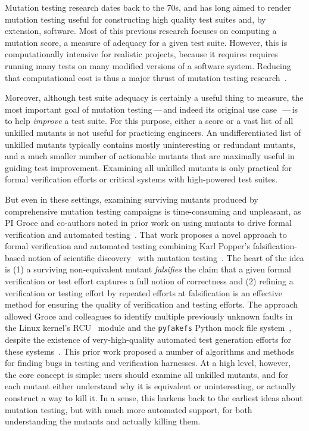 Mutation testing research dates back to the 70s, and has long aimed to render
mutation testing useful for constructing high quality
test suites and, by extension, software.
Most of this previous
research focuses on computing a mutation score, a measure of adequacy for a
given test suite.  However, this is computationally intensive for realistic
projects, because it requires requires running many tests on many modified
versions of a software system.  Reducing that computational cost is thus a major
thrust of mutation testing research~\cite{jia2011analysis}.

Moreover, although test suite adequacy is certainly a useful thing to measure, the most
important goal of mutation testing\,---\,and indeed its original use
case~\cite{budd1980theoretical}\,---\,is to help \emph{improve} a test suite.  For this
purpose, either a score or a vast list of all unkilled mutants is not useful for practicing engineers.  An
undifferentiated list of unkilled mutants typically contains mostly uninteresting or
redundant mutants, and a much smaller number of actionable mutants that are
maximally useful in guiding test improvement.  Examining all unkilled
mutants is only practical for formal verification efforts or critical
systems with high-powered test suites.

But even in these settings, examining
surviving mutants produced by comprehensive mutation testing campaigns is
time-consuming and unpleasant, as PI Groce and co-authors noted in prior work on
using mutants to drive formal verification and automated
testing~\cite{groce2015verified,groce2018verified,mutKernel}.
%
That work proposes a novel approach to
formal verification and automated testing
combining Karl Popper's falsification-based notion of
scientific discovery~\cite{Popper,popperconjectures} with mutation
testing~\cite{groce2015verified,groce2018verified,mutKernel}.
The heart of the idea is (1) a surviving non-equivalent mutant
\emph{falsifies} the claim that a given
formal verification or test effort captures a full notion of
correctness and (2) refining a
verification or testing effort by repeated efforts at falsification is an
effective method for ensuring the quality of verification and testing
efforts.  The
approach allowed Groce and colleagues to identify multiple previously unknown faults in
the Linux kernel's
RCU~\cite{MathieuDesnoyers2012URCU,DinakarGuniguntala2008IBMSysJ,McKenney:2013:SDS:2483852.2483867}
module and the {\tt pyfakefs} Python mock file
system~\cite{pyfakefs}, despite the existence of very-high-quality
automated test generation efforts for these
systems~\cite{rcutorture,TSTL}.  This prior work
proposed a number of algorithms and
methods for finding bugs in testing and verification
harnesses.  At a high level, however,
the core concept is simple:  users should examine all unkilled
mutants, and for each mutant either understand why it is
equivalent or uninteresting, or actually construct a way to kill it.  In a sense, this harkens back to the
earliest ideas about mutation testing, but with
much more automated support, for both understanding the mutants and
actually killing them.

